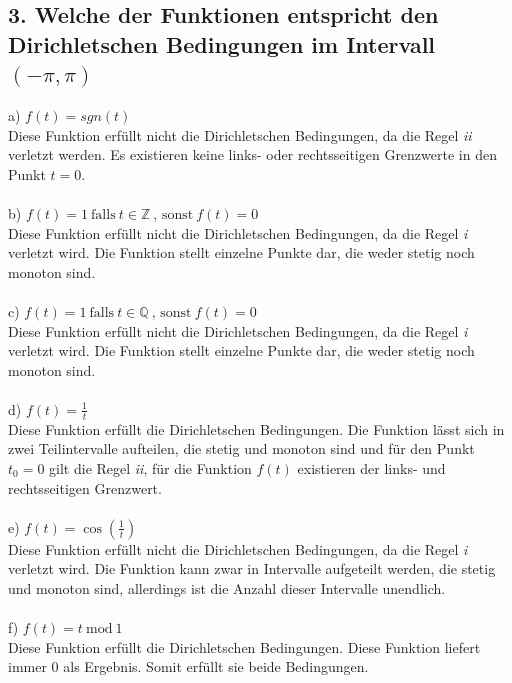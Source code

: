 \subsection*{3. Welche der Funktionen entspricht den Dirichletschen Bedingungen im Intervall $(-\pi,\pi)$}
a) $f(t) = sgn(t)$\\
Diese Funktion erf\"ullt nicht die Dirichletschen Bedingungen, da die Regel \textit{ii} verletzt werden. Es existieren keine links- oder rechtsseitigen Grenzwerte in den Punkt $t = 0$.\\\\
b) $f(t) = 1~\text{falls}~t \in \mathds{Z}~\text{, sonst}~f(t) = 0$\\
Diese Funktion erf\"ullt nicht die Dirichletschen Bedingungen, da die Regel \textit{i} verletzt wird. Die Funktion stellt einzelne Punkte dar, die weder stetig noch monoton sind.\\\\
c) $f(t) = 1~\text{falls}~t \in \mathds{Q}~\text{, sonst}~f(t) = 0$\\
Diese Funktion erf\"ullt nicht die Dirichletschen Bedingungen, da die Regel \textit{i} verletzt wird. Die Funktion stellt einzelne Punkte dar, die weder stetig noch monoton sind.\\\\
d) $f(t) = \frac{1}{t}$\\
Diese Funktion erf\"ullt die Dirichletschen Bedingungen. Die Funktion l\"asst sich in zwei Teilintervalle aufteilen, die stetig und monoton sind und f\"ur den Punkt $t_0 = 0$ gilt die Regel \textit{ii}, f\"ur die Funktion $f(t)$ existieren der links- und rechtsseitigen Grenzwert.\\\\
e) $f(t) = \cos(\frac{1}{t})$\\
Diese Funktion erf\"ullt nicht die Dirichletschen Bedingungen, da die Regel \textit{i} verletzt wird. Die Funktion kann zwar in Intervalle aufgeteilt werden, die stetig und monoton sind, allerdings ist die Anzahl dieser Intervalle unendlich.\\\\ 
f) $f(t) = t~\text{mod}~1$\\
Diese Funktion erf\"ullt die Dirichletschen Bedingungen. Diese Funktion liefert immer $0$ als Ergebnis. Somit erf\"ullt sie beide Bedingungen.